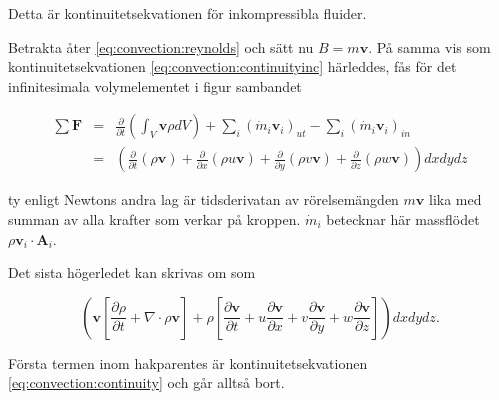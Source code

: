 Detta är kontinuitetsekvationen för inkompressibla fluider.

Betrakta åter \eqref{eq:convection:reynolds} och sätt nu $B = m\mathbf{v}$. På samma vis som kontinuitetsekvationen \eqref{eq:convection:continuityinc} härleddes, fås för det infinitesimala volymelementet i figur sambandet

\begin{eqnarray}
\label{eq:convection:linear}
\sum \mathbf{F} & = & \frac{\partial}{\partial t} \left( \int_V \mathbf{v} \rho dV \right) + \sum_i \left( \dot{m}_i \mathbf{v}_i \right)_{ut} - \sum_i \left( \dot{m}_i \mathbf{v}_i \right)_{in}\nonumber\\
& = &\left(\frac{\partial}{\partial t} \left( \rho\mathbf{v} \right) + \frac{\partial}{\partial x}\left( \rho u \mathbf{v}\right) + \frac{\partial}{\partial y}\left( \rho v \mathbf{v}\right) + \frac{\partial}{\partial z}\left( \rho w \mathbf{v}\right)\right)dxdydz
\end{eqnarray}

ty enligt Newtons andra lag är tidsderivatan av rörelsemängden $m\mathbf{v}$ lika med summan av alla krafter som verkar på kroppen. $\dot{m}_i$ betecknar här massflödet $\rho\mathbf{v}_i\cdot\mathbf{A}_i$.

Det sista högerledet kan skrivas om som

\begin{equation}
\left( \mathbf{v}\left[ \frac{\partial \rho}{\partial t} + \nabla\cdot \rho \mathbf{v}\right] + \rho\left[ \frac{\partial \mathbf{v}}{\partial t} + u\frac{\partial\mathbf{v}}{\partial x} + v\frac{\partial\mathbf{v}}{\partial y} + w\frac{\partial\mathbf{v}}{\partial z} \right]\right)dxdydz.
\end{equation}

Första termen inom hakparentes är kontinuitetsekvationen \eqref{eq:convection:continuity} och går alltså bort.

